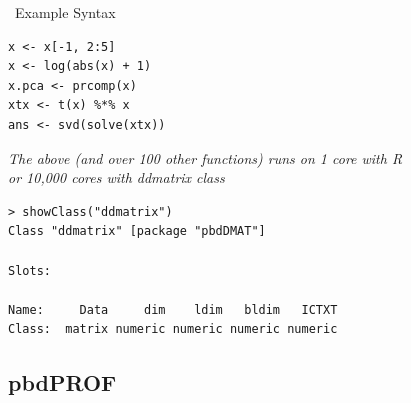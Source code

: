 \begin{frame}[fragile]
  \begin{block}{\pbdR\ Example Syntax}
  \begin{lstlisting}
x <- x[-1, 2:5]
x <- log(abs(x) + 1)
x.pca <- prcomp(x)
xtx <- t(x) %*% x
ans <- svd(solve(xtx))
  \end{lstlisting}
  \begin{center}
  \emph{The above (and over 100 other functions) runs on 1 core with R \\
    or 10,000 cores with \pbdR ddmatrix class}
  \end{center}
\begin{lstlisting}
> showClass("ddmatrix")
Class "ddmatrix" [package "pbdDMAT"]

Slots:
                                              
Name:     Data     dim    ldim   bldim   ICTXT
Class:  matrix numeric numeric numeric numeric
\end{lstlisting}
  \end{block}
\end{frame}

\subsection{pbdPROF}

